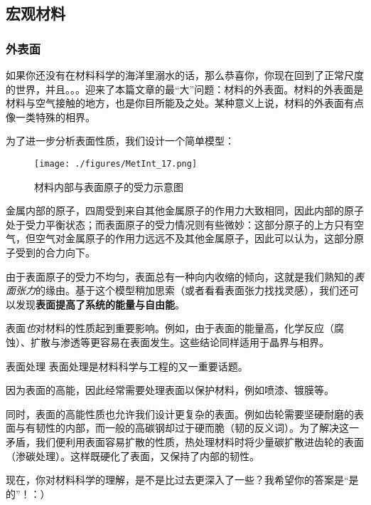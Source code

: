 \subsection{宏观材料}\label{MetInt_sub1}
\subsubsection{外表面}
如果你还没有在材料科学的海洋里溺水的话，那么恭喜你，你现在回到了正常尺度的世界，并且。。。迎来了本篇文章的最“大”问题：材料的外表面。材料的外表面是材料与空气接触的地方，也是你目所能及之处。某种意义上说，材料的外表面有点像一类特殊的相界。

为了进一步分析表面性质，我们设计一个简单模型：
\begin{figure}[ht]
\centering
\texttt{[image: ./figures/MetInt\_17.png]}
\caption{材料内部与表面原子的受力示意图} \label{MetInt_fig17}
\end{figure}
金属内部的原子，四周受到来自其他金属原子的作用力大致相同，因此内部的原子处于受力平衡状态；而表面原子的受力情况则有些微妙：这部分原子的上方只有空气，但空气对金属原子的作用力远远不及其他金属原子，因此可以认为，这部分原子受到的合力向下。

由于表面原子的受力不均匀，表面总有一种向内收缩的倾向，这就是我们熟知的\textsl{表面张力}的缘由。基于这个模型稍加思索（或者看看表面张力找找灵感），我们还可以发现\textbf{表面提高了系统的能量与自由能}。

表面\textsl{也}对材料的性质起到重要影响。例如，由于表面的能量高，化学反应（腐蚀）、扩散与渗透等更容易在表面发生。这些结论同样适用于晶界与相界。

\begin{example}{表面处理}
表面处理是材料科学与工程的又一重要话题。

因为表面的高能，因此经常需要处理表面以保护材料，例如喷漆、镀膜等。

同时，表面的高能性质也允许我们设计更复杂的表面。例如齿轮需要坚硬耐磨的表面与有韧性的内部，而一般的高碳钢却过于硬而脆（韧的反义词）。为了解决这一矛盾，我们便利用表面容易扩散的性质，热处理材料时将少量碳扩散进齿轮的表面（渗碳处理）。这样既硬化了表面，又保持了内部的韧性。
\end{example}

现在，你对材料科学的理解，是不是比过去更深入了一些？我希望你的答案是“是的”！：）
